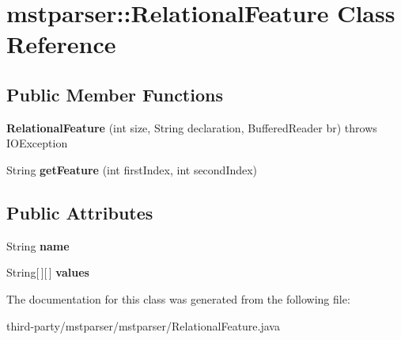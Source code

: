 \hypertarget{classmstparser_1_1RelationalFeature}{
\section{mstparser::RelationalFeature Class Reference}
\label{classmstparser_1_1RelationalFeature}
}
\subsection*{Public Member Functions}
\begin{DoxyCompactItemize}
\item 
\hypertarget{classmstparser_1_1RelationalFeature_aae30e08a19c391ee20957979f15a8d52}{
{\bfseries RelationalFeature} (int size, String declaration, BufferedReader br)  throws IOException }
\label{classmstparser_1_1RelationalFeature_aae30e08a19c391ee20957979f15a8d52}

\item 
\hypertarget{classmstparser_1_1RelationalFeature_a46df7d745110c0c9ead9c84e27915d79}{
String {\bfseries getFeature} (int firstIndex, int secondIndex)}
\label{classmstparser_1_1RelationalFeature_a46df7d745110c0c9ead9c84e27915d79}

\end{DoxyCompactItemize}
\subsection*{Public Attributes}
\begin{DoxyCompactItemize}
\item 
\hypertarget{classmstparser_1_1RelationalFeature_a20da55ded8d249ee396bd2c296e4ca95}{
String {\bfseries name}}
\label{classmstparser_1_1RelationalFeature_a20da55ded8d249ee396bd2c296e4ca95}

\item 
\hypertarget{classmstparser_1_1RelationalFeature_a7f77d67c3c193bfa8803bdc5e38418b0}{
String\mbox{[}$\,$\mbox{]}\mbox{[}$\,$\mbox{]} {\bfseries values}}
\label{classmstparser_1_1RelationalFeature_a7f77d67c3c193bfa8803bdc5e38418b0}

\end{DoxyCompactItemize}


The documentation for this class was generated from the following file:\begin{DoxyCompactItemize}
\item 
third-\/party/mstparser/mstparser/RelationalFeature.java\end{DoxyCompactItemize}
